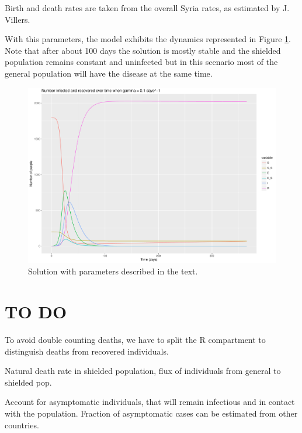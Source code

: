 \documentclass{article}
\begin{document}
Birth and death rates are taken from the overall Syria rates, as estimated by
J. Villers.

With this parameters, the model exhibits the dynamics represented in Figure
\ref{fig:seir_solution}. Note that after about 100 days the solution is mostly
stable and the shielded population remains constant and uninfected but in this
scenario most of the general population will have the disease at the same time.

\begin{figure}[ht]
    \includegraphics[width=.95\linewidth]{seir_solution}
    \caption{Solution with parameters described in the
text.}\label{fig:seir_solution}
\end{figure}

\section{TO DO}

To avoid double counting deaths, we have to split the R compartment to
distinguish deaths from recovered individuals.

Natural death rate in shielded population, flux of individuals from
general to shielded pop.

Account for asymptomatic individuals, that will remain infectious and in
contact with the population. Fraction of asymptomatic cases can be estimated
from other countries.
\end{document}
